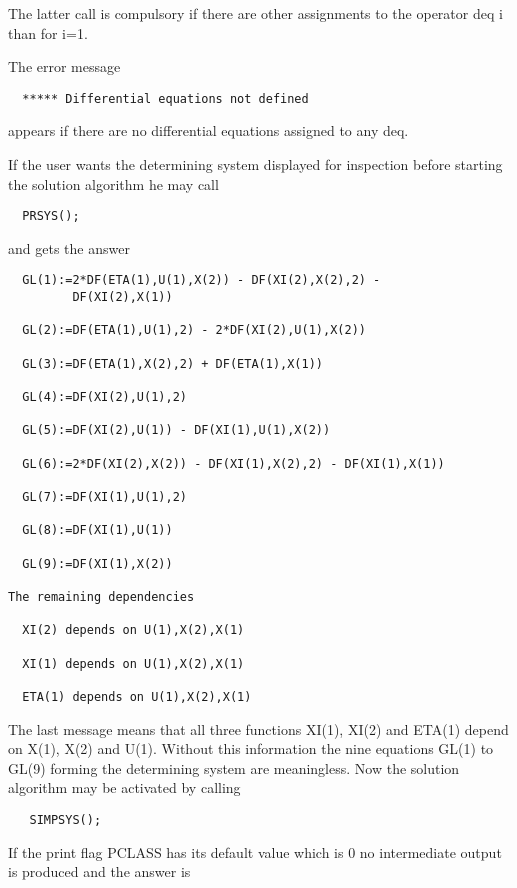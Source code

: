 The latter call is compulsory if there are other assignments to the
operator deq i than for i=1.

The error message

\begin{verbatim}
  ***** Differential equations not defined
\end{verbatim}

appears if there are no differential equations assigned to any deq.

If the user wants the determining system displayed for inspection
before starting the solution algorithm he may call

\begin{verbatim}
  PRSYS();
\end{verbatim}

and gets the answer

\begin{verbatim}
  GL(1):=2*DF(ETA(1),U(1),X(2)) - DF(XI(2),X(2),2) -
         DF(XI(2),X(1))

  GL(2):=DF(ETA(1),U(1),2) - 2*DF(XI(2),U(1),X(2))

  GL(3):=DF(ETA(1),X(2),2) + DF(ETA(1),X(1))

  GL(4):=DF(XI(2),U(1),2)

  GL(5):=DF(XI(2),U(1)) - DF(XI(1),U(1),X(2))

  GL(6):=2*DF(XI(2),X(2)) - DF(XI(1),X(2),2) - DF(XI(1),X(1))

  GL(7):=DF(XI(1),U(1),2)

  GL(8):=DF(XI(1),U(1))

  GL(9):=DF(XI(1),X(2))

The remaining dependencies

  XI(2) depends on U(1),X(2),X(1)

  XI(1) depends on U(1),X(2),X(1)

  ETA(1) depends on U(1),X(2),X(1)
\end{verbatim}

The last message means that all three functions XI(1), XI(2) and
ETA(1) depend on X(1), X(2) and U(1). Without this information the
nine equations GL(1) to GL(9) forming the determining system are
meaningless. Now the solution algorithm may be activated by calling

\begin{verbatim}
   SIMPSYS();
\end{verbatim}

If the print flag PCLASS has its default value which is 0 no
intermediate output is produced and the answer is

